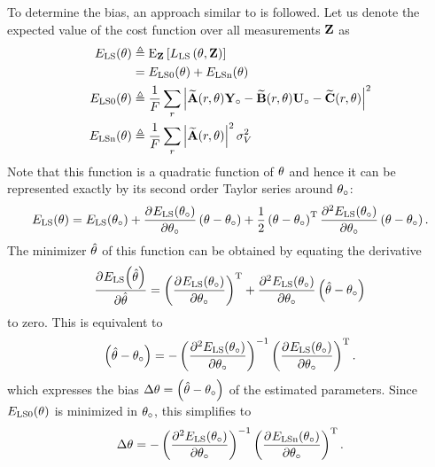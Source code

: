 To determine the bias, an approach similar to \citep[Appendix A]{Guillaume1995} is followed.
Let us denote the expected value of the cost function over all measurements $\LocalVector{Z}$ as
\begin{align}
  \ELSCost{\theta}
              & \isdef 
                   \E[\LocalVector{Z}]%
                         {    
                                \LSCost{\LocalVector{\theta}, \LocalVector{Z}}} \\
              & = \ELSCost[0]{\theta} + \ELSCost[n]{\theta} \\
    \ELSCost[0]{\theta} & \isdef 
            \frac{1}{F} 
                \sum_{r} 
                     \left| 
                             \LocalModel{A}(r, \LocalVector{\theta}) \true{\LocalVector{Y}}
                          - \LocalModel{B}(r, \LocalVector{\theta}) \true{\LocalVector{U}}
                          - \LocalModel{C}(r, \LocalVector{\theta}) 
                    \right|^2 \\
    \ELSCost[n]{\theta} & \isdef 
              \frac{1}{F} 
                     \sum_{r} 
                              \left| \LocalModel{A}(r,\LocalVector{\theta}) \right|^2 
                              \sigma_V^2
\end{align}
Note that this function is a quadratic function of $\LocalVector{\theta}$ and hence it can be represented exactly by its second order Taylor series around $\true\theta$:
\begin{multline}
  \ELSCost{\theta} = \ELSCost{\true\theta} 
  + \PartialDerivative{\ELSCost{\true\theta}}{\true\theta}  \left( \theta - \true\theta \right) %
  + \frac{1}{2} \left( \theta - \true\theta \right)^{\T} 
  \PartialDerivative[2]{\ELSCost{\true\theta}}{\true\theta} 
   \left( \theta - \true\theta \right)
   \text{.}
\end{multline}
The minimizer $\estim\theta$ of this function can be obtained by equating the derivative
\begin{equation}
  \PartialDerivative{\ELSCost{\estim\theta}}{\estim\theta} = \left( \PartialDerivative{\ELSCost{\true\theta}}{\true\theta} \right)^{\T} + \PartialDerivative[2]{\ELSCost{\true\theta}}{\true\theta} 
   \left( \estim\theta - \true\theta \right)
\end{equation}
to zero.
This is equivalent to 
\begin{equation}
  \left( \estim\theta - \true\theta \right) = - \left(   \PartialDerivative[2]{\ELSCost{\true\theta}}{\true\theta} \right)^{-1}  \left( \PartialDerivative{\ELSCost{\true\theta}}{\true\theta} \right)^{\T}
  \text{.}
\end{equation}
which expresses the bias $\Delta\theta = \left( \estim\theta - \true\theta \right)$ of the estimated parameters.
Since $\ELSCost[0]{\theta}$ is minimized in $\true\theta$, this simplifies to
\begin{equation}
  \Delta\theta = - \left(   \PartialDerivative[2]{\ELSCost{\true\theta}}{\true\theta} \right)^{-1}  \left( \PartialDerivative{\ELSCost[n]{\true\theta}}{\true\theta} \right)^{\T}
  \text{.}
\end{equation}

